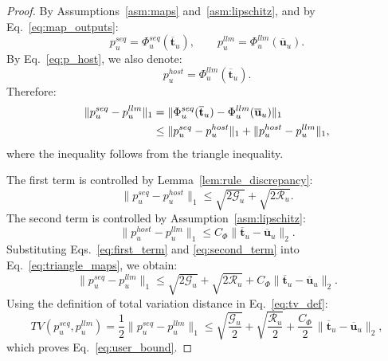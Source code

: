 ﻿\documentclass{article}
\begin{document}
\begin{proof}
By Assumptions~\ref{asm:maps} and~\ref{asm:lipschitz}, and by Eq.~\eqref{eq:map_outputs}:
\begin{equation}
p_u^{seq}=\Phi_u^{seq}(\overline{\mathbf{t}}_u),
\qquad
p_u^{llm}=\Phi_u^{llm}(\overline{\mathbf{u}}_u).
\label{eq:proof_start}
\end{equation}
By Eq.~\eqref{eq:p_host}, we also denote:
\begin{equation}
p_u^{host}=\Phi_u^{llm}(\overline{\mathbf{t}}_u).
\label{eq:proof_host}
\end{equation}
Therefore:
\begin{align}
\|p_u^{seq}-p_u^{llm}\|_1
&= 
\|\Phi_u^{seq}(\overline{\mathbf{t}}_u)-\Phi_u^{llm}(\overline{\mathbf{u}}_u)\|_1 \notag\\
&\le
\|p_u^{seq}-p_u^{host}\|_1
+
\|p_u^{host}-p_u^{llm}\|_1,
\label{eq:triangle_maps}
\end{align}
where the inequality follows from the triangle inequality.

The first term is controlled by Lemma~\ref{lem:rule_discrepancy}:
\begin{equation}
\|p_u^{seq}-p_u^{host}\|_1
\le
\sqrt{2\mathcal G_u}
+
\sqrt{2\mathcal R_u}.
\label{eq:first_term}
\end{equation}
The second term is controlled by Assumption~\ref{asm:lipschitz}:
\begin{equation}
\|p_u^{host}-p_u^{llm}\|_1
\le
C_\Phi\|\overline{\mathbf{t}}_u-\overline{\mathbf{u}}_u\|_2.
\label{eq:second_term}
\end{equation}
Substituting Eqs.~\eqref{eq:first_term} and \eqref{eq:second_term} into Eq.~\eqref{eq:triangle_maps}, we obtain:
\begin{equation}
\|p_u^{seq}-p_u^{llm}\|_1
\le
\sqrt{2\mathcal G_u}
+
\sqrt{2\mathcal R_u}
+
C_\Phi\|\overline{\mathbf{t}}_u-\overline{\mathbf{u}}_u\|_2.
\label{eq:l1_bound}
\end{equation}
Using the definition of total variation distance in Eq.~\eqref{eq:tv_def}:
\begin{equation}
TV(p_u^{seq},p_u^{llm})
=
\frac{1}{2}\|p_u^{seq}-p_u^{llm}\|_1
\le
\sqrt{\frac{\mathcal G_u}{2}}
+
\sqrt{\frac{\mathcal R_u}{2}}
+
\frac{C_\Phi}{2}\,\|\overline{\mathbf{t}}_u-\overline{\mathbf{u}}_u\|_2,
\end{equation}
which proves Eq.~\eqref{eq:user_bound}.


\end{proof}
\end{document}
